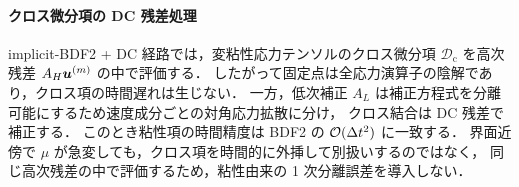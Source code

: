 \paragraph{クロス微分項の DC 残差処理}
implicit-BDF2 + DC 経路では，変粘性応力テンソルのクロス微分項
$\mathcal{D}_{\mathrm{c}}$ を高次残差 $A_H\bm{u}^{(m)}$ の中で評価する．
したがって固定点は全応力演算子の陰解であり，クロス項の時間遅れは生じない．
一方，低次補正 $A_L$ は補正方程式を分離可能にするため速度成分ごとの対角応力拡散に分け，
クロス結合は DC 残差で補正する．
このとき粘性項の時間精度は BDF2 の $\mathcal{O}(\Delta t^2)$ に一致する．
界面近傍で $\mu$ が急変しても，クロス項を時間的に外挿して別扱いするのではなく，
同じ高次残差の中で評価するため，粘性由来の 1 次分離誤差を導入しない．

